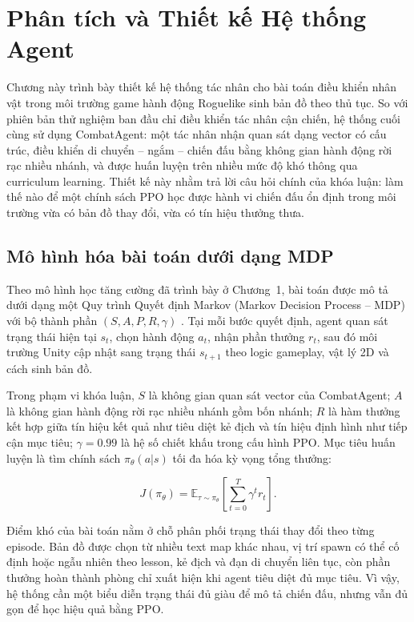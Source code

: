 \setcounter{secnumdepth}{3}

\setcounter{chapter}{1}
\chapter[{PHÂN TÍCH VÀ THIẾT KẾ HỆ THỐNG AGENT}]{Phân tích và Thiết kế Hệ thống Agent}

Chương này trình bày thiết kế hệ thống tác nhân cho bài toán điều khiển nhân vật trong môi trường game hành động Roguelike sinh bản đồ theo thủ tục. So với phiên bản thử nghiệm ban đầu chỉ điều khiển tác nhân cận chiến, hệ thống cuối cùng sử dụng CombatAgent: một tác nhân nhận quan sát dạng vector có cấu trúc, điều khiển di chuyển -- ngắm -- chiến đấu bằng không gian hành động rời rạc nhiều nhánh, và được huấn luyện trên nhiều mức độ khó thông qua curriculum learning. Thiết kế này nhằm trả lời câu hỏi chính của khóa luận: làm thế nào để một chính sách PPO học được hành vi chiến đấu ổn định trong môi trường vừa có bản đồ thay đổi, vừa có tín hiệu thưởng thưa.

\section{Mô hình hóa bài toán dưới dạng MDP}

Theo mô hình học tăng cường đã trình bày ở Chương~1, bài toán được mô tả dưới dạng một Quy trình Quyết định Markov (Markov Decision Process -- MDP) với bộ thành phần $(S,A,P,R,\gamma)$ \cite{Schulman2017}. Tại mỗi bước quyết định, agent quan sát trạng thái hiện tại $s_t$, chọn hành động $a_t$, nhận phần thưởng $r_t$, sau đó môi trường Unity cập nhật sang trạng thái $s_{t+1}$ theo logic gameplay, vật lý 2D và cách sinh bản đồ.

Trong phạm vi khóa luận, $S$ là không gian quan sát vector của CombatAgent; $A$ là không gian hành động rời rạc nhiều nhánh gồm bốn nhánh; $R$ là hàm thưởng kết hợp giữa tín hiệu kết quả như tiêu diệt kẻ địch và tín hiệu định hình như tiếp cận mục tiêu; $\gamma=0.99$ là hệ số chiết khấu trong cấu hình PPO. Mục tiêu huấn luyện là tìm chính sách $\pi_{\theta}(a|s)$ tối đa hóa kỳ vọng tổng thưởng:

\begin{equation}
    J(\pi_\theta) = \mathbb{E}_{\tau \sim \pi_\theta}
    \left[\sum_{t=0}^{T}\gamma^t r_t\right].
\end{equation}

Điểm khó của bài toán nằm ở chỗ phân phối trạng thái thay đổi theo từng episode. Bản đồ được chọn từ nhiều text map khác nhau, vị trí spawn có thể cố định hoặc ngẫu nhiên theo lesson, kẻ địch và đạn di chuyển liên tục, còn phần thưởng hoàn thành phòng chỉ xuất hiện khi agent tiêu diệt đủ mục tiêu. Vì vậy, hệ thống cần một biểu diễn trạng thái đủ giàu để mô tả chiến đấu, nhưng vẫn đủ gọn để học hiệu quả bằng PPO.

